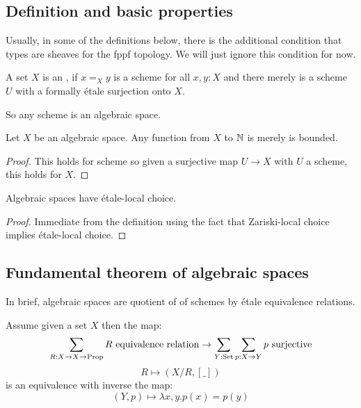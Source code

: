 \subsection{Definition and basic properties}

Usually, in some of the definitions below,
there is the additional condition that types are sheaves for the fppf topology.
We will just ignore this condition for now.

\begin{definition}
  A set $X$ is an ,
  if $x=_Xy$ is a scheme for all $x,y:X$ and
  there merely is a scheme $U$ with a formally étale surjection onto $X$.
\end{definition}

So any scheme is an algebraic space.

\begin{lemma}
Let $X$ be an algebraic space. Any function from $X$ to $\mathbb{N}$ is merely is bounded.
\end{lemma}

\begin{proof}
This holds for scheme so given a surjective map $U\to X$ with $U$ a scheme, this holds for $X$.
\end{proof}

\begin{lemma}
Algebraic spaces have étale-local choice.
\end{lemma}

\begin{proof}
Immediate from the definition using the fact that Zariski-local choice implies étale-local choice.
\end{proof}

\subsection{Fundamental theorem of algebraic spaces}

In brief, algebraic spaces are quotient of of schemes by étale equivalence relations.

\begin{lemma}\label{quotient-by-equivalence-relation}
Assume given a set $X$ then the map:
\[ \sum_{R:X\to X\to \Prop} R\ \mathrm{equivalence\ relation} \to \sum_{Y:\mathrm{Set}} \sum_{p:X\to Y} p\ \mathrm{surjective}\]
\[R \mapsto (X/R,[\_])\]
is an equivalence with inverse the map:
\[(Y,p) \mapsto \lambda x,y. p(x)=p(y)\]
\end{lemma}

